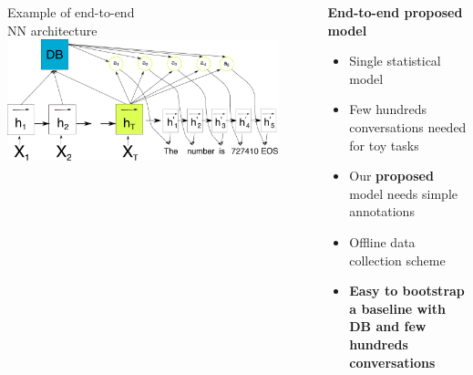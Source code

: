 \documentclass[10pt, compress,british,xcolor={svgnames,dvipsnames,x11names},trans]{beamer}
\begin{document}
\begin{frame}
\begin{columns}
\begin{column}{0.2\textwidth}
            \vfill
        \begin{center} 
            {\tiny Example of end-to-end \\ NN architecture}
            \includegraphics[width=0.9\textwidth]{./encdecdb.pdf} 
        \end{center}
\end{column}
\begin{column}{0.45\textwidth}
    {\bf End-to-end proposed model}
    \begin{itemize}
        \item Single statistical model
        \item Few hundreds conversations needed for toy tasks~\cite{wen_networkbased_2016}
        \item Our {\bf proposed} model needs simple annotations
        \item {\color{darkgreen} Offline data collection scheme}~\cite{wen_networkbased_2016,platek2016wochat}
        \item {\bf \color{darkgreen} Easy to bootstrap a baseline with DB and few hundreds conversations}
    \end{itemize}
\end{column}
\end{columns}
\end{frame}
\end{document}
